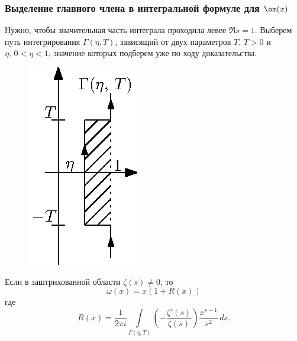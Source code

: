\subsubsection{Выделение главного члена в интегральной формуле для $\om(x)$}

Нужно, чтобы значительная часть интеграла проходила левее $\Re s=1$. Выберем путь интегрирования $\Gamma(\eta, T)$, зависящий от двух параметров $T,\,T>0$ и $\eta,\,0<\eta<1$, значение которых подберем уже по ходу доказательства.\par
\begin{figure}
\begin{center}
\vskip -20pt
\includegraphics[scale=1.0, trim=20 0 0 0]{05021}
\end{center}
\end{figure}
\begin{stm} Если в заштрихованной области $\zeta(s) \not = 0$, то
$$\omega(x) = x(1 + R(x))$$ где $$R(x) = \frac{1}{2\pi i} \int\limits_{\Gamma(\eta, T)} \left(-\frac{\zeta '(s)}{\zeta (s)}\right)\frac{x^{s-1}}{s^2}\,ds.$$
\end{stm}
